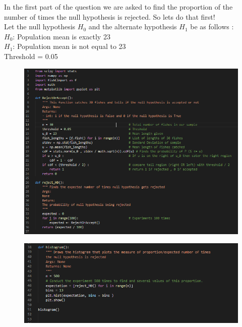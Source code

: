 \documentclass[answers]{exam}
\begin{document}
\begin{framed}

In the first part of the question we are asked to find the proportion of the number of times the null hypothesis is rejected. So lets do that first! \\
Let the null hypothesis $H_0$ and the alternate hypothesis $H_1$ be as follows : \\
$H_0$: Population mean is exactly 23 \\
$H_1$: Population mean is not equal to 23 \\
Threshold = 0.05\\

\begin{figure}[H] %
    \centering
    \includegraphics[width= 1 \textwidth]{Q5.2_code_1.PNG}
\end{figure}

\begin{figure}[H] %
    \centering
    \includegraphics[width= 1 \textwidth]{Q5.2_code_2.PNG}
\end{figure}
    

\end{framed}
\end{document}
